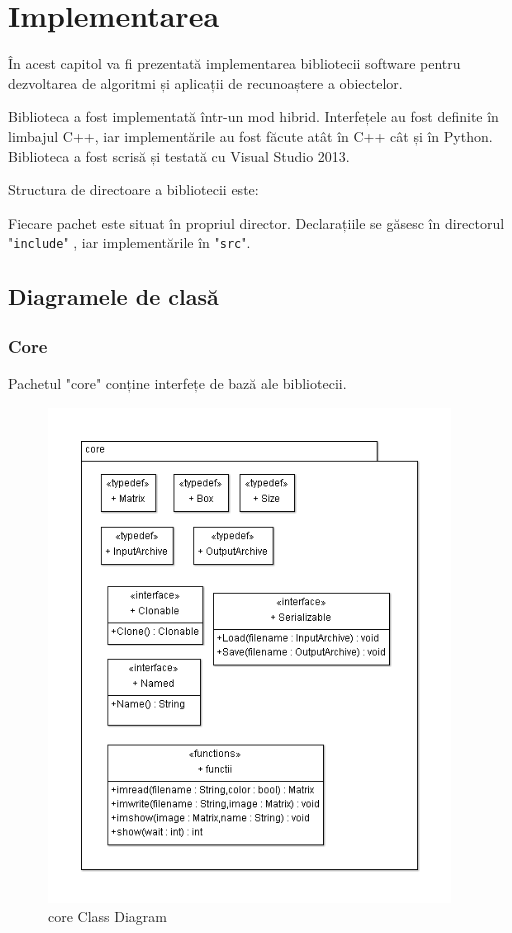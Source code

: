 \chapter{Implementarea}

În acest capitol va fi prezentată implementarea bibliotecii software pentru dezvoltarea de algoritmi și aplicații de recunoaștere a obiectelor.

Biblioteca a fost implementată într-un mod hibrid.
Interfețele au fost definite în limbajul C++, iar implementările au fost făcute atât în C++ cât și în Python.
Biblioteca a fost scrisă și testată cu Visual Studio 2013.


Structura de directoare a bibliotecii este:

Fiecare pachet este situat în propriul director.
Declarațiile se găsesc în directorul "\verb!include!"
, iar implementările în "\verb!src!".

\pagebreak
\section{Diagramele de clasă}

\subsection{Core}
Pachetul "core" conține interfețe de bază ale bibliotecii.
\begin{figure}[H]
	\centering
		\includegraphics[width=0.95\textwidth]{uml/coreClassDiagram.png}
	\caption{core Class Diagram}
	\label{fig:coreClassDiagram}
\end{figure}

